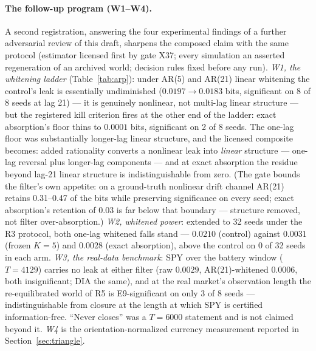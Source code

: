 \documentclass[11pt]{article}
\begin{document}
\paragraph{The follow-up program (W1--W4).}
A second registration, answering the four experimental findings of a
further adversarial review of this draft, sharpens the composed claim
with the same protocol (estimator licensed first by gate X37; every
simulation an asserted regeneration of an archived world; decision rules
fixed before any run). \emph{W1, the whitening ladder}
(Table~\ref{tab:arp}): under AR(5) and AR(21) linear whitening the
control's leak is essentially undiminished ($0.0197 \to 0.0183$ bits,
significant on 8 of 8 seeds at lag 21) --- it is genuinely nonlinear,
not multi-lag linear structure --- but the registered kill criterion
fires at the other end of the ladder: exact absorption's floor thins to
$0.0001$ bits, significant on 2 of 8 seeds. The one-lag floor was
substantially longer-lag linear structure, and the licensed composite
becomes: added rationality converts a nonlinear leak into \emph{linear}
structure --- one-lag reversal plus longer-lag components --- and at
exact absorption the residue beyond lag-21 linear structure is
indistinguishable from zero. (The gate bounds the filter's own appetite:
on a ground-truth nonlinear drift channel AR(21) retains 0.31--0.47 of
the bits while preserving significance on every seed; exact absorption's
retention of 0.03 is far below that boundary --- structure removed, not
filter over-absorption.) \emph{W2, whitened power}: extended to 32 seeds
under the R3 protocol, both one-lag whitened falls stand --- $0.0210$
(control) against $0.0031$ (frozen $K{=}5$) and $0.0028$ (exact
absorption), above the control on 0 of 32 seeds in each arm. \emph{W3,
the real-data benchmark}: SPY over the battery window ($T = 4129$)
carries no leak at either filter (raw $0.0029$, AR(21)-whitened
$0.0006$, both insignificant; DIA the same), and at the real market's
observation length the re-equilibrated world of R5 is E9-significant on
only 3 of 8 seeds --- indistinguishable from closure at the length at
which SPY is certified information-free. ``Never closes'' was a
$T = 6000$ statement and is not claimed beyond it. \emph{W4} is the
orientation-normalized currency measurement reported in
Section~\ref{sec:triangle}.
\end{document}
